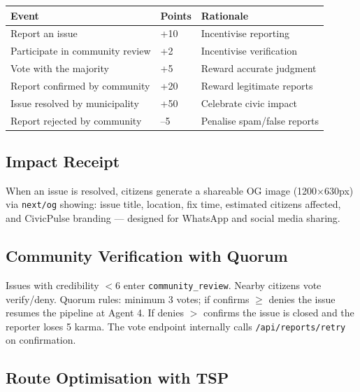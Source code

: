 \documentclass[11pt,a4paper]{article}
\newcommand{\thead}[1]{{\color{white}\bfseries\sffamily #1}}
\newcommand{\tech}[1]{\texttt{\color{cpteal}#1}}
\newcommand{\file}[1]{\texttt{\footnotesize\color{cpgray}#1}}
\begin{document}
\begin{tabular}{@{} L{6cm} C{2cm} L{5cm} @{}}
\toprule
{}
\thead{Event} & \thead{Points} & \thead{Rationale} \\
\midrule
Report an issue                  & +10 & Incentivise reporting \\
Participate in community review  & +2  & Incentivise verification \\
Vote with the majority           & +5  & Reward accurate judgment \\
Report confirmed by community    & +20 & Reward legitimate reports \\
Issue resolved by municipality   & +50 & Celebrate civic impact \\
Report rejected by community     & --5 & Penalise spam/false reports \\
\bottomrule
\end{tabular}

\subsection{Impact Receipt}
When an issue is resolved, citizens generate a shareable OG image (1200×630px) via \tech{next/og} showing: issue title, location, fix time, estimated citizens affected, and CivicPulse branding — designed for WhatsApp and social media sharing.

\subsection{Community Verification with Quorum}
Issues with credibility $< 6$ enter \tech{community\_review}. Nearby citizens vote verify/deny. Quorum rules: minimum 3 votes; if confirms $\geq$ denies the issue resumes the pipeline at Agent 4. If denies $>$ confirms the issue is closed and the reporter loses 5 karma. The vote endpoint internally calls \file{/api/reports/retry} on confirmation.

\subsection{Route Optimisation with TSP}
\end{document}
